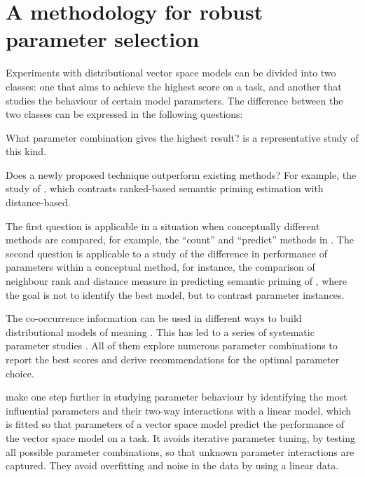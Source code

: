 \chapter{A methodology for robust parameter selection}
\label{sec:methodology}

Experiments with distributional vector space models can be divided into two classes: one that aims to achieve the highest score on a task, and another that studies the behaviour of certain model parameters. The difference between the two classes can be expressed in the following questions:

\begin{compactitem}
\item What parameter combination gives the highest result?  is a representative study of this kind.
\item Does a newly proposed technique outperform existing methods? For example, the
  study of , which contrasts ranked-based semantic priming estimation with distance-based.
\end{compactitem}

The first question is applicable in a situation when conceptually different methods are compared, for example, the ``count'' and  ``predict'' methods in . The second question is applicable to a study of the difference in performance of parameters within a conceptual method, for instance, the comparison of neighbour rank and distance measure in predicting semantic priming of , where the goal is not to identify the best model, but to contrast parameter instances.

The co-occurrence information can be used in different ways to build distributional models of meaning \cite{Turney:2010:FMV:1861751.1861756}. This has led to a series of  systematic parameter studies \cite{Bullinaria2007,BullinariaLevy2012,kiela-clark:2014:CVSC,lapesa2014large,TACL570}. All of them explore numerous parameter combinations to report the best scores and derive recommendations for the optimal parameter choice.

 make one step further in studying parameter behaviour by identifying the most influential parameters and their two-way interactions with a linear model, which is fitted so that parameters of a vector space model predict the performance of the vector space model on a task. It avoids iterative parameter tuning, by testing all possible parameter combinations, so that unknown parameter interactions are captured. They avoid overfitting\footnotemark{} and noise in the data by using a linear data.

